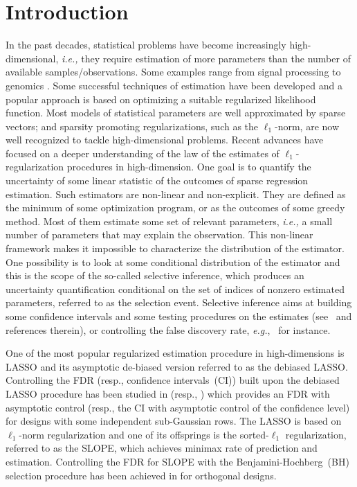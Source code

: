 \documentclass[final,numbib]{imaiai}%
\numberwithin{equation}{section}
\newcommand{\<}{\langle}
\renewcommand{\>}{\rangle}
\newcommand{\1}{\mathds{1}}
\begin{document}
\section{Introduction}
In the past decades, statistical problems have become increasingly high-dimensional, {\it i.e.,} they require estimation of more parameters than the number of available samples/observations. Some examples range from signal processing \citep{Chen_Donoho_Saunders98,Candes_Romberg_Tao06} to genomics \citep{rhee2006genotypic,barber2015controlling}. Some successful techniques of estimation have been developed and a popular approach is based on optimizing a suitable regularized likelihood function. Most models of statistical parameters are well approximated by sparse vectors; and sparsity promoting regularizations, such as the $\ell_1$-norm, are now well recognized to tackle high-dimensional problems. Recent advances have focused on a deeper understanding of the law of the estimates of $\ell_1$-regularization procedures in high-dimension. One goal is to quantify the uncertainty of some linear statistic of the outcomes of sparse regression estimation. Such estimators are non-linear and non-explicit. They are defined as the minimum of some optimization program, or as the outcomes of some greedy method. Most of them estimate some set of relevant parameters, {\it i.e.,} a small number of parameters that may explain the observation. This non-linear framework makes it impossible to characterize the distribution of the estimator. One possibility is to look at some conditional distribution of the estimator and this is the scope of the so-called selective inference, which produces an uncertainty quantification conditional on the set of indices of nonzero estimated parameters, referred to as the selection event. Selective inference aims at building some confidence intervals and some testing procedures on the estimates (see~\cite[Chapter 6]{van2016estimation} and references therein), or controlling the false discovery rate, {\it e.g.},~\cite{barber2015controlling} for instance. 

One of the most popular regularized estimation procedure in high-dimensions is LASSO \citep{Chen_Donoho_Saunders98} and its asymptotic de-biased version referred to as the debiased LASSO. Controlling the FDR (resp., confidence intervals~(CI)) built upon the debiased LASSO procedure has been studied in \cite{javanmard2019false} (resp., \cite{javanmard2014confidence}) which provides an FDR with asymptotic control (resp., the CI with asymptotic control of the confidence level) for designs with some independent sub-Gaussian rows. The LASSO is based on $\ell_1$-norm regularization and one of its offsprings is the sorted-$\ell_1$ regularization, referred to as the SLOPE, which achieves minimax rate of prediction and estimation. Controlling the FDR for SLOPE with the Benjamini-Hochberg~(BH) selection procedure has been achieved in \cite{bogdan2015slope} for orthogonal designs. 
\end{document}
